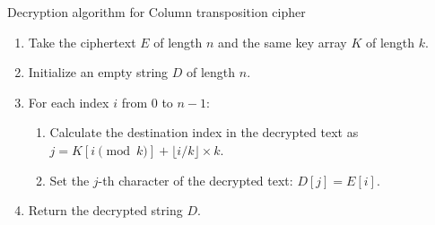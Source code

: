 Decryption algorithm for Column transposition cipher
\begin{enumerate}
  \item Take the ciphertext $E$ of length $n$ and the same key array $K$ of length $k$.
  \item Initialize an empty string $D$ of length $n$.
  \item For each index $i$ from $0$ to $n-1$:
  \begin{enumerate}
    \item Calculate the destination index in the decrypted text as $j = K[i \pmod k] + \lfloor i / k \rfloor \times k$.
    \item Set the $j$-th character of the decrypted text: $D[j] = E[i]$.
  \end{enumerate}
  \item Return the decrypted string $D$.
\end{enumerate}





